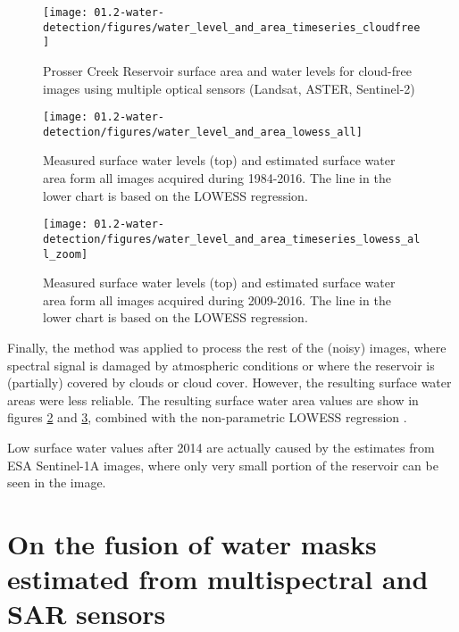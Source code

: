 \begin{figure}[H]
	\centering
	\texttt{[image: 01.2-water-detection/figures/water\_level\_and\_area\_timeseries\_cloudfree]}
	\caption{Prosser Creek Reservoir surface area and water levels for cloud-free images using multiple optical sensors (Landsat, ASTER, Sentinel-2)}
	\label{fig:water_level_and_area_timeseries_cloudfree}
\end{figure}

\begin{figure}[H]
	\centering
	\texttt{[image: 01.2-water-detection/figures/water\_level\_and\_area\_lowess\_all]}
	\caption{Measured surface water levels (top) and estimated surface water area form all images acquired during 1984-2016. The line in the lower chart is based on the LOWESS regression.}
	\label{fig:water_level_and_area_timeseries_lowess_all}
\end{figure}

\begin{figure}[H]
	\centering
	\texttt{[image: 01.2-water-detection/figures/water\_level\_and\_area\_timeseries\_lowess\_all\_zoom]}
	\caption{Measured surface water levels (top) and estimated surface water area form all images acquired during 2009-2016. The line in the lower chart is based on the LOWESS regression.}
	\label{fig:water_level_and_area_timeseries_lowess_all_zoom}
\end{figure}

Finally, the method was applied to process the rest of the (noisy) images, where spectral signal is damaged by atmospheric conditions or where the reservoir is (partially) covered by clouds or cloud cover. However, the resulting surface water areas were less reliable. The resulting surface water area values are show in figures \ref{fig:water_level_and_area_timeseries_lowess_all} and \ref{fig:water_level_and_area_timeseries_lowess_all_zoom}, combined with the non-parametric LOWESS regression \citep{cleveland1979robust}. 

Low surface water values after 2014 are actually caused by the estimates from ESA Sentinel-1A images, where only very small portion of the reservoir can be seen in the image.

\section{On the fusion of water masks estimated from multispectral and SAR sensors}

